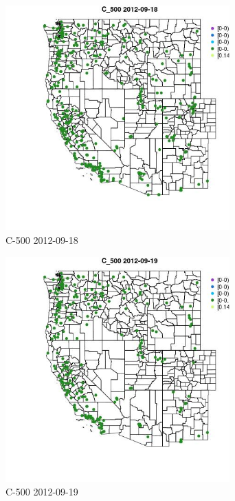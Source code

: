 \begin{figure} 
\centering  
\includegraphics[width=0.77\textwidth]{Code_Outputs/ML_input_report_ML_input_PM25_Step5_part_d_de_duplicated_aves_ML_input_MapObsC_5002012-09-18.jpg} 
\caption{\label{fig:ML_input_report_ML_input_PM25_Step5_part_d_de_duplicated_aves_ML_inputMapObsC_5002012-09-18}C-500 2012-09-18} 
\end{figure} 
 

\clearpage 

\begin{figure} 
\centering  
\includegraphics[width=0.77\textwidth]{Code_Outputs/ML_input_report_ML_input_PM25_Step5_part_d_de_duplicated_aves_ML_input_MapObsC_5002012-09-19.jpg} 
\caption{\label{fig:ML_input_report_ML_input_PM25_Step5_part_d_de_duplicated_aves_ML_inputMapObsC_5002012-09-19}C-500 2012-09-19} 
\end{figure} 
 

